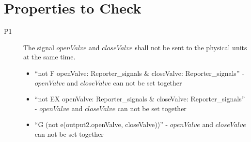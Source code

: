\documentclass{report} %
\begin{document}

\chapter{Properties to Check}
\begin{description}
    \item[P1] The signal $openValve$ and $closeValve$ shall not be sent to the physical units at the same time.
        \begin{itemize}
            \item ``not F {openValve: Reporter_signals & closeValve: Reporter_signals}'' - $openValve$ and $closeValve$ can not be set together
            \item ``not EX {openValve: Reporter_signals & closeValve: Reporter_signals}'' - $openValve$ and $closeValve$ can not be set together
            \item ``G (not e(output2.{openValve, closeValve}))'' - $openValve$ and $closeValve$ can not be set together
        \end{itemize}
\end{description}
\end{document}
